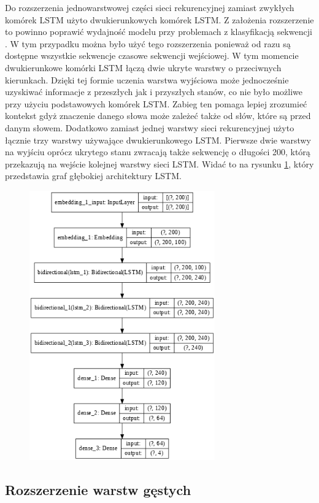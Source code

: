 Do rozszerzenia jednowarstwowej części sieci rekurencyjnej zamiast zwykłych komórek LSTM użyto dwukierunkowych komórek LSTM. Z założenia rozszerzenie to powinno poprawić wydajność modelu przy problemach z klasyfikacją sekwencji \cite{ding2018densely}. W tym przypadku można było użyć tego rozszerzenia ponieważ od razu są dostępne wszystkie sekwencje czasowe sekwencji wejściowej. W tym momencie dwukierunkowe komórki LSTM łączą dwie ukryte warstwy o przeciwnych kierunkach. Dzięki tej formie uczenia warstwa wyjściowa może jednocześnie uzyskiwać informacje z przeszłych jak i przyszłych stanów, co nie było możliwe przy użyciu podstawowych komórek LSTM. Zabieg ten pomaga lepiej zrozumieć kontekst gdyż znaczenie danego słowa może zależeć także od słów, które są przed danym słowem. Dodatkowo zamiast jednej warstwy sieci rekurencyjnej użyto łącznie trzy warstwy używające dwukierunkowego LSTM. Pierwsze dwie warstwy na wyjściu oprócz ukrytego stanu zwracają także sekwencję o długości 200, którą przekazują na wejście kolejnej warstwy sieci LSTM. Widać to na rysunku \ref{rys:lstm_deep_graph}, który przedstawia graf głębokiej architektury LSTM.

\begin{figure}[t]
\centering\includegraphics[width=8cm]{figures/reports/lstm_deep_graph.png}
\label{rys:lstm_deep_graph}
\end{figure}

\subsection{Rozszerzenie warstw gęstych}

